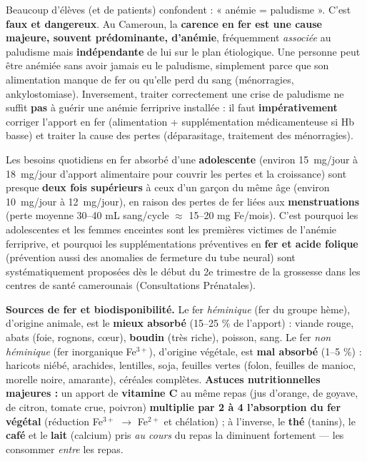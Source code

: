 \documentclass[11pt]{article}
\begin{document}
\begin{attention}
Beaucoup d'élèves (et de patients) confondent : « anémie = paludisme ». C'est \textbf{faux et dangereux}. Au Cameroun, la \textbf{carence en fer est une cause majeure, souvent prédominante, d'anémie}, fréquemment \emph{associée} au paludisme mais \textbf{indépendante} de lui sur le plan étiologique. Une personne peut être anémiée sans avoir jamais eu le paludisme, simplement parce que son alimentation manque de fer ou qu'elle perd du sang (ménorragies, ankylostomiase). Inversement, traiter correctement une crise de paludisme ne suffit \textbf{pas} à guérir une anémie ferriprive installée : il faut \textbf{impérativement} corriger l'apport en fer (alimentation + supplémentation médicamenteuse si Hb basse) et traiter la cause des pertes (déparasitage, traitement des ménorragies).
\end{attention}

\begin{exemplebox}
Les besoins quotidiens en fer absorbé d'une \textbf{adolescente} (environ \SI{15}{mg/jour} à \SI{18}{mg/jour} d'apport alimentaire pour couvrir les pertes et la croissance) sont presque \textbf{deux fois supérieurs} à ceux d'un garçon du même âge (environ \SI{10}{mg/jour} à \SI{12}{mg/jour}), en raison des pertes de fer liées aux \textbf{menstruations} (perte moyenne 30--40 mL sang/cycle $\approx$ 15--20 mg Fe/mois). C'est pourquoi les adolescentes et les femmes enceintes sont les premières victimes de l'anémie ferriprive, et pourquoi les supplémentations préventives en \textbf{fer et acide folique} (prévention aussi des anomalies de fermeture du tube neural) sont systématiquement proposées dès le début du 2e trimestre de la grossesse dans les centres de santé camerounais (Consultations Prénatales).
\end{exemplebox}

\textbf{Sources de fer et biodisponibilité.} Le fer \emph{héminique} (fer du groupe hème), d'origine animale, est le \textbf{mieux absorbé} (15--25 \% de l'apport) : viande rouge, abats (foie, rognons, cœur), \textbf{boudin} (très riche), poisson, sang. Le fer \emph{non héminique} (fer inorganique Fe$^{3+}$), d'origine végétale, est \textbf{mal absorbé} (1--5 \%) : haricots niébé, arachides, lentilles, soja, feuilles vertes (folon, feuilles de manioc, morelle noire, amarante), céréales complètes. \textbf{Astuces nutritionnelles majeures :} un apport de \textbf{vitamine C} au même repas (jus d'orange, de goyave, de citron, tomate crue, poivron) \textbf{multiplie par 2 à 4 l'absorption du fer végétal} (réduction Fe$^{3+}$ $\to$ Fe$^{2+}$ et chélation) ; à l'inverse, le \textbf{thé} (tanins), le \textbf{café} et le \textbf{lait} (calcium) pris \emph{au cours} du repas la diminuent fortement — les consommer \emph{entre} les repas.
\end{document}
